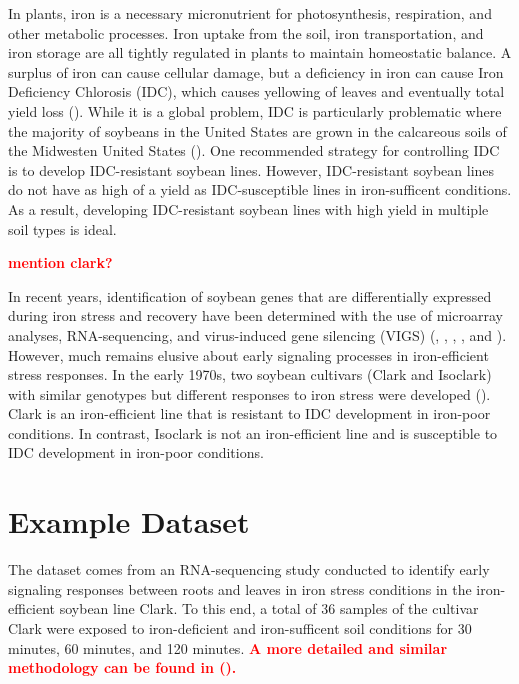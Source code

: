 \documentclass[11pt,a4paper,oldfontcommands,openany]{memoir}
\numberwithin{equation}{section} %
\begin{document}
In plants, iron is a necessary micronutrient for photosynthesis, respiration, and other metabolic processes. Iron uptake from the soil, iron transportation, and iron storage are all tightly regulated in plants to maintain homeostatic balance. A surplus of iron can cause cellular damage, but a deficiency in iron can cause Iron Deficiency Chlorosis (IDC), which causes yellowing of leaves and eventually total yield loss (\citealt{soy1}). While it is a global problem, IDC is particularly problematic where the majority of soybeans in the United States are grown in the calcareous soils of the Midwesten United States (\citealt{soy3}). One recommended strategy for controlling IDC is to develop IDC-resistant soybean lines. However, IDC-resistant soybean lines do not have as high of a yield as IDC-susceptible lines in iron-sufficent conditions. As a result, developing IDC-resistant soybean lines with high yield in multiple soil types is ideal.

\textbf{\textcolor{Red}{mention clark?}}

In recent years, identification of soybean genes that are differentially expressed during iron stress and recovery have been determined with the use of microarray analyses, RNA-sequencing, and virus-induced gene silencing (VIGS) (\citealt{soy11}, \citealt{soy12}, \citealt{soy13}, \citealt{soy14}, and \citealt{soy15}). However, much remains elusive about early signaling processes in iron-efficient stress responses. In the early 1970s, two soybean cultivars (Clark and Isoclark) with similar genotypes but different responses to iron stress were developed (\citealt{soy10}). Clark is an iron-efficient line that is resistant to IDC development in iron-poor conditions. In contrast, Isoclark is not an iron-efficient line and is susceptible to IDC development in iron-poor conditions.

\section{Example Dataset}

The dataset comes from an RNA-sequencing study conducted to identify early signaling responses between roots and leaves in iron stress conditions in the iron-efficient soybean line Clark. To this end, a total of 36 samples of the cultivar Clark were exposed to iron-deficient and iron-sufficent soil conditions for 30 minutes, 60 minutes, and 120 minutes. \textbf{\textcolor{Red}{A more detailed and similar methodology can be found in (\citealt{adSoy}).}}
\end{document}
